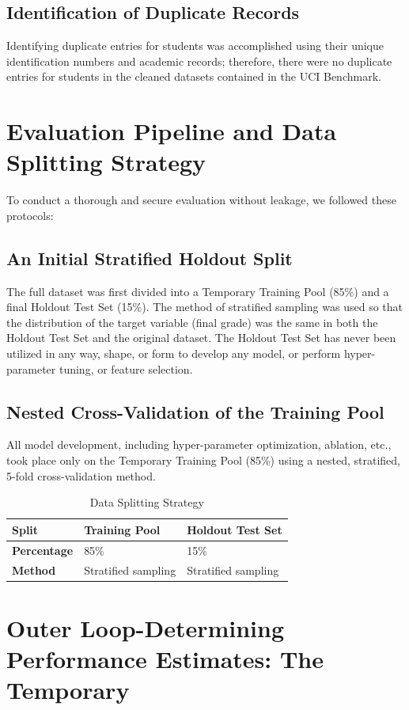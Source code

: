 \documentclass[twocolumn]{svjour3}
\begin{document}
\subsection{Identification of Duplicate Records}
Identifying duplicate entries for students was accomplished using their unique identification numbers and academic records; therefore, there were no duplicate entries for students in the cleaned datasets contained in the UCI Benchmark.
\section{Evaluation Pipeline and Data Splitting Strategy}
To conduct a thorough and secure evaluation without leakage, we followed these protocols:
\subsection{An Initial Stratified Holdout Split}
The full dataset was first divided into a Temporary Training Pool (85\%) and a final Holdout Test Set (15\%). The method of stratified sampling was used so that the distribution of the target variable (final grade) was the same in both the Holdout Test Set and the original dataset. The Holdout Test Set has never been utilized in any way, shape, or form to develop any model, or perform hyper-parameter tuning, or feature selection.
\subsection{Nested Cross-Validation of the Training Pool}
All model development, including hyper-parameter optimization, ablation, etc., took place only on the Temporary Training Pool (85\%) using a nested, stratified, 5-fold cross-validation method.
\begin{table}[htbp]
\centering
\caption{Data Splitting Strategy}
\begin{tabular}{lll}
\hline
\textbf{Split} & \textbf{Training Pool} & \textbf{Holdout Test Set} \\
\hline
\textbf{Percentage} & 85\% & 15\% \\
\textbf{Method} & Stratified sampling & Stratified sampling \\
\hline
\end{tabular}
\end{table}

\section{Outer Loop-Determining Performance Estimates: The Temporary}
\end{document}
